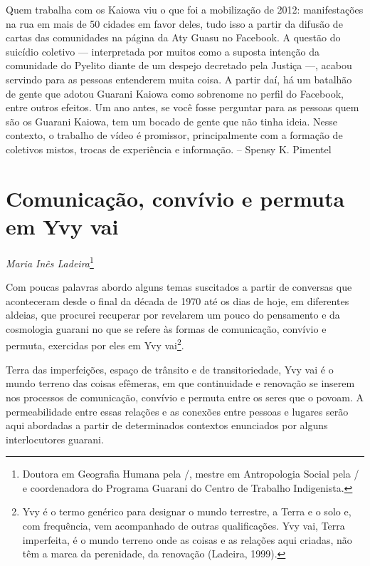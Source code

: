 {{Quem trabalha com os Kaiowa viu o que foi a mobilização de 2012:
manifestações na rua em mais de 50 cidades em favor deles, tudo isso a
partir da difusão de cartas das comunidades na página da Aty Guasu no
Facebook. A questão do suicídio coletivo --- interpretada por muitos como
a suposta intenção da comunidade do Pyelito diante de um despejo
decretado pela Justiça ---, acabou servindo para as pessoas entenderem
muita coisa. A partir daí, há um batalhão de gente que adotou Guarani
Kaiowa como sobrenome no perfil do Facebook, entre outros efeitos. Um
ano antes, se você fosse perguntar para as pessoas quem são os Guarani
Kaiowa, tem um bocado de gente que não tinha ideia. Nesse contexto, o
trabalho de vídeo é promissor, principalmente com a formação de
coletivos mistos, trocas de experiência e informação. – Spensy K.
Pimentel 

\chapter{Comunicação, convívio e permuta em Yvy vai}
\begin{flushright}
\emph{Maria Inês Ladeira}\footnote{Doutora em Geografia Humana pela
/, mestre em Antropologia Social pela / e coordenadora do
Programa Guarani do Centro de Trabalho Indigenista.}
\end{flushright}

Com poucas palavras abordo alguns temas suscitados a partir de conversas
que aconteceram desde o final da década de 1970 até os dias de hoje, em
diferentes aldeias, que procurei recuperar por revelarem um pouco do
pensamento e da cosmologia guarani no que se refere às formas de
comunicação, convívio e permuta, exercidas por eles em Yvy
vai\footnote{Yvy é o termo genérico para designar o mundo terrestre, a
Terra e o solo e, com frequência, vem acompanhado de outras
qualificações. Yvy vai, Terra imperfeita, é o mundo terreno onde as
coisas e as relações aqui criadas, não têm a marca da perenidade, da
renovação (Ladeira, 1999).}.  

Terra das imperfeições, espaço de trânsito e de transitoriedade, Yvy vai
é o mundo terreno das coisas efêmeras, em que continuidade e renovação
se inserem nos processos de comunicação, convívio e permuta entre os
seres que o povoam. A permeabilidade entre essas relações e as conexões
entre pessoas e lugares serão aqui abordadas a partir de determinados
contextos enunciados por alguns interlocutores guarani. 

}}

